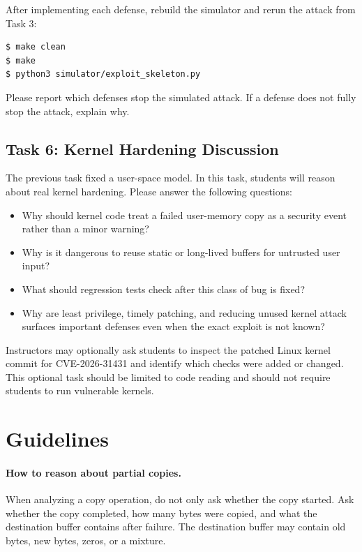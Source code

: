 After implementing each defense, rebuild the simulator and rerun the attack
from Task 3:

\begin{lstlisting}
$ make clean
$ make
$ python3 simulator/exploit_skeleton.py
\end{lstlisting}

Please report which defenses stop the simulated attack. If a defense does not
fully stop the attack, explain why.


\subsection{Task 6: Kernel Hardening Discussion}

The previous task fixed a user-space model. In this task, students will reason
about real kernel hardening. Please answer the following questions:

\begin{itemize}[noitemsep]
\item Why should kernel code treat a failed user-memory copy as a security
      event rather than a minor warning?
\item Why is it dangerous to reuse static or long-lived buffers for untrusted
      user input?
\item What should regression tests check after this class of bug is fixed?
\item Why are least privilege, timely patching, and reducing unused kernel
      attack surfaces important defenses even when the exact exploit is not
      known?
\end{itemize}

Instructors may optionally ask students to inspect the patched Linux kernel
commit for CVE-2026-31431 and identify which checks were added or changed. This
optional task should be limited to code reading and should not require students
to run vulnerable kernels.


\section{Guidelines}

\paragraph{How to reason about partial copies.}
When analyzing a copy operation, do not only ask whether the copy started. Ask
whether the copy completed, how many bytes were copied, and what the destination
buffer contains after failure. The destination buffer may contain old bytes,
new bytes, zeros, or a mixture.

